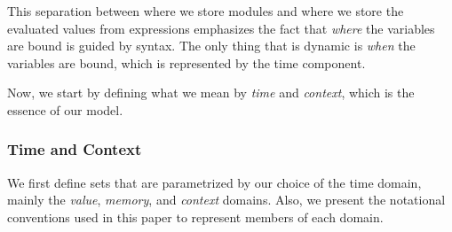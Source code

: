 \documentclass[acmsmall,screen,review]{acmart}
\theoremstyle{definition}
\begin{document}
This separation between where we store modules and where we store the evaluated values from expressions emphasizes the fact that \emph{where} the variables are bound is guided by syntax.
The only thing that is dynamic is \emph{when} the variables are bound, which is represented by the time component.

Now, we start by defining what we mean by \emph{time} and \emph{context}, which is the essence of our model.

\subsubsection{Time and Context}

We first define sets that are parametrized by our choice of the time domain, mainly the \emph{value}, \emph{memory}, and \emph{context} domains.
Also, we present the notational conventions used in this paper to represent members of each domain.
\end{document}
